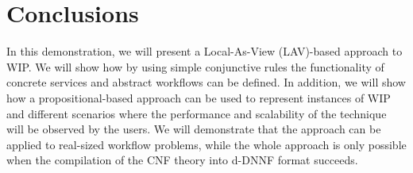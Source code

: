 \documentclass{llncs}
\begin{document}
\section{Conclusions}
In this demonstration, we will present a Local-As-View (LAV)-based approach \cite{levy:bucket} to WIP. We will show how by using simple conjunctive rules the functionality of concrete services and abstract workflows can be defined. In addition, we will show how a propositional-based approach can be used to represent instances of WIP and different scenarios where the performance and scalability of the technique will be observed by the users.  We will demonstrate that the approach can be applied to
real-sized workflow problems, while the whole approach is only possible
when the compilation of the CNF theory into d-DNNF format succeeds.


 
\end{document}
